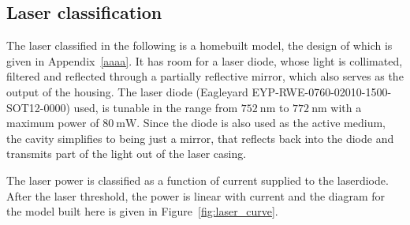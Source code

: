 \subsection{Laser classification}

The laser classified in the following is a homebuilt model, the design of which is given in Appendix~\ref{aaaa}. It has room for a laser diode, whose light is collimated, filtered and reflected through a partially reflective mirror, which also serves as the output of the housing.
The laser diode (Eagleyard EYP-RWE-0760-02010-1500-SOT12-0000) used, is tunable in the range from $\SI{752}{\nano\meter}$ to $\SI{772}{\nano\meter}$ with a maximum power of $\SI{80}{\milli\watt}$. Since the diode is also used as the active medium, the cavity simplifies to being just a mirror, that reflects back into the diode and transmits part of the light out of the laser casing.

The laser power is classified as a function of current supplied to the laserdiode. After the laser threshold, the power is linear with current and the diagram for the model built here is given in Figure~\ref{fig:laser_curve}.


\begin{figure}[t]%
\end{figure}

